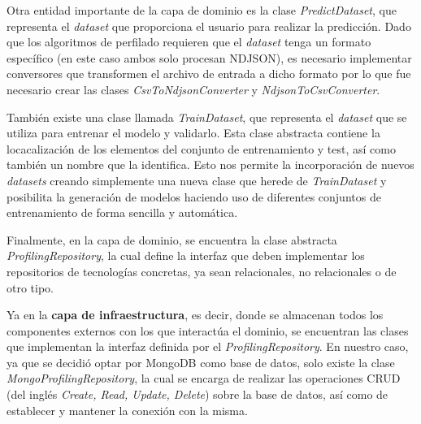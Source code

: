 \bigskip
Otra entidad importante de la capa de dominio es la clase \textit{PredictDataset}, que representa el \textit{dataset} que proporciona el usuario
para realizar la predicción. Dado que los algoritmos de perfilado requieren que el \textit{dataset} tenga un formato específico (en este caso
ambos solo procesan NDJSON), es necesario implementar conversores que transformen el archivo de entrada a dicho formato por lo que
fue necesario crear las clases \textit{CsvToNdjsonConverter} y \textit{NdjsonToCsvConverter}.

\bigskip
También existe una clase llamada \textit{TrainDataset}, que representa
el \textit{dataset} que se utiliza para entrenar el modelo y validarlo. Esta clase abstracta contiene la locacalización de los elementos
del conjunto de entrenamiento y test, así como también un nombre que la identifica. Esto nos permite la incorporación de nuevos \textit{datasets} creando simplemente
una nueva clase que herede de \textit{TrainDataset} y posibilita la generación de modelos haciendo uso de diferentes conjuntos de entrenamiento de forma sencilla y automática. 

\bigskip
Finalmente, en la capa de dominio, se encuentra la clase abstracta \textit{ProfilingRepository}, la cual define la interfaz que deben implementar
los repositorios de tecnologías concretas, ya sean relacionales, no relacionales o de otro tipo.

\bigskip
Ya en la \textbf{capa de infraestructura}, es decir, donde se almacenan todos los componentes externos con los que interactúa el dominio, se encuentran las clases que implementan
la interfaz definida por el \textit{ProfilingRepository}. En nuestro caso, ya que se decidió optar por MongoDB como base de datos, solo existe
la clase \textit{MongoProfilingRepository}, la cual se encarga de realizar las operaciones CRUD (del inglés \textit{Create, Read, Update, Delete}) sobre la base de datos, así
como de establecer y mantener la conexión con la misma.

